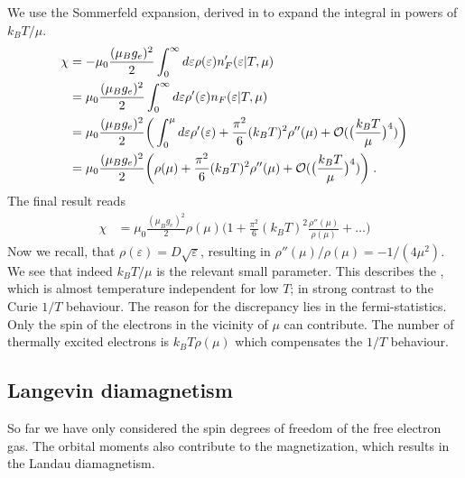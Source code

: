 We use the Sommerfeld expansion, derived in  to expand the integral in powers of $k_{B}T/\mu$. 
%
\begin{align*}
\chi &=-\mu_{0}\frac{(\mu_{B}g_{e})^{2} }{2}  \int_{0}^{\infty}d\varepsilon \rho(\varepsilon)  n'_{F}(\varepsilon|T,\mu)\notag\\
&=\mu_{0}\frac{(\mu_{B}g_{e})^{2} }{2}  \int_{0}^{\infty}d\varepsilon \rho'(\varepsilon)  n_{F}(\varepsilon|T,\mu)\\
 &=\mu_{0}\frac{(\mu_{B}g_{e})^{2} }{2}  \bigg(\int_{0}^{\mu}d\varepsilon \rho'(\varepsilon)
+\frac{\pi^{2}}{6}(k_{B}T)^{2}\rho''(\mu)+ {\cal O}(\big(\frac{k_{B}T}{\mu}\big)^{4})
 \bigg)\\    
  &=\mu_{0}\frac{(\mu_{B}g_{e})^{2} }{2}  \bigg( \rho(\mu)
+\frac{\pi^{2}}{6}(k_{B}T)^{2}\rho''(\mu)+ {\cal O}(\big(\frac{k_{B}T}{\mu}\big)^{4})
 \bigg)\;.
\end{align*}
%
The final result reads
%
\begin{align}\label{eq:para:chi}
\chi   &=\mu_{0}\frac{(\mu_{B}g_{e})^{2} }{2}  \rho(\mu)\bigg( 1
+\frac{\pi^{2}}{6}(k_{B}T)^{2}\frac{\rho''(\mu)}{\rho(\mu)}+\ldots
 \bigg)
\end{align}
%
Now we recall, that $\rho(\varepsilon) = D \sqrt{\varepsilon}$, resulting in
$\rho''(\mu)/\rho(\mu)=-1/(4\mu^{2})$. 
%
%
We see that indeed $k_{B}T/\mu$ is the relevant small parameter.
This describes the , which is almost temperature
independent for low $T$; in strong contrast to the Curie $1/T$ behaviour.
The reason for the discrepancy lies in the fermi-statistics. Only the spin of the electrons in the vicinity of $\mu$ can contribute. The number of thermally excited electrons
is $k_{B} T \rho(\mu)$ which compensates the $1/T$ behaviour.


\subsection{Langevin diamagnetism}
So far we have only considered the spin degrees of freedom of the free electron gas. The orbital moments also contribute to the magnetization, which results in the Landau diamagnetism.

